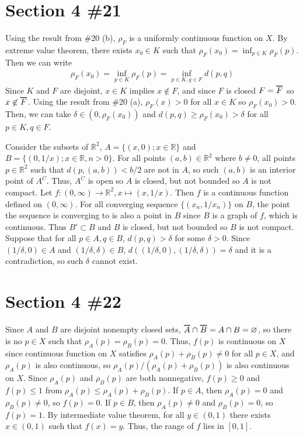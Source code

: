 \documentclass{scrartcl}
\newcommand\Overline[2][0.8pt]{%
  \begin{tikzpicture}[baseline=(a.base)]
    \node[inner xsep=0pt,inner ysep=1.5pt] (a) {$#2$};
    \draw[line width= #1] (a.north west) -- (a.north east);
  \end{tikzpicture}
}
\begin{document}
\section{Section 4 \#21}
Using the result from \#20 (b), \(\rho_F\) is a uniformly continuous function on \(X\).
By extreme value theorem, there exists \(x_0 \in K\) such that \(\rho_F(x_0) = \inf_{p \in K} \rho_F(p)\).
Then we can write
\begin{align*}
  \rho_F(x_0) = \inf_{p \in K} \rho_F(p) = \inf_{p \in K, q \in F} d(p, q)
\end{align*}
Since \(K\) and \(F\) are disjoint, \(x \in K\) implies \(x \not \in F\), and since \(F\) is closed \(F = \Overline{F}\) so \(x \not \in \Overline{F}\).
Using the result from \#20 (a), \(\rho_F(x) > 0\) for all \(x \in K\) so \(\rho_F(x_0) > 0\).
Then, we can take \(\delta \in (0, \rho_F(x_0))\) and \(d(p, q) \geq \rho_F(x_0) > \delta\) for all \(p \in K, q \in F\).

Consider the subsets of \(\mathbb{R}^2\), \(A = \{(x, 0); x \in \mathbb{R}\}\) and \(B = \{(0, 1 / x); x \in \mathbb{R}, n > 0\}\).
For all points \((a, b) \in \mathbb{R}^2\) where \(b \not = 0\), all points \(p \in \mathbb{R}^2\) such that \(d(p, (a, b)) < b / 2\) are not in \(A\), so such \((a, b)\) is an interior point of \(A^C\).
Thus, \(A^C\) is open so \(A\) is closed, but not bounded so \(A\) is not compact.
Let \(f : (0, \infty) \to \mathbb{R}^2, x \mapsto (x, 1 / x)\).
Then \(f\) is a continuous function defined on \((0, \infty)\).
For all converging sequence \(\{(x_n, 1 / x_n)\}\) on \(B\), the point the sequence is converging to is also a point in \(B\) since \(B\) is a graph of \(f\), which is continuous.
Thus \(B' \subset B\) and \(B\) is closed, but not bounded so \(B\) is not compact.
Suppose that for all \(p \in A, q \in B\), \(d(p, q) > \delta\) for some \(\delta > 0\).
Since \((1 / \delta, 0) \in A\) and \((1 / \delta, \delta) \in B\), \(d((1 / \delta, 0), (1 / \delta, \delta)) = \delta\) and it is a contradiction, so such \(\delta\) cannot exist.

\section{Section 4 \#22}
Since \(A\) and \(B\) are disjoint nonempty closed sets, \(\Overline{A} \cap \Overline{B} = A \cap B = \varnothing\), so there is no \(p \in X\) such that \(\rho_A(p) = \rho_B(p) = 0\).
Thus, \(f(p)\) is continuous on \(X\) since continuous function on \(X\) satisfies \(\rho_A(p) + \rho_B(p) \not = 0\) for all \(p \in X\), and \(\rho_A(p)\) is also continuous, so \(\rho_A(p) / (\rho_A(p) + \rho_B(p))\) is also continuous on \(X\).
Since \(\rho_A(p)\) and \(\rho_B(p)\) are both nonnegative, \(f(p) \geq 0\) and \(f(p) \leq 1\) from \(\rho_A(p) \leq \rho_A(p) + \rho_B(p)\).
If \(p \in A\), then \(\rho_A(p) = 0\) and \(\rho_B(p) \not = 0\), so \(f(p) = 0\).
If \(p \in B\), then \(\rho_A(p) \not = 0\) and \(\rho_B(p) = 0\), so \(f(p) = 1\).
By intermediate value theorem, for all \(y \in (0, 1)\) there exists \(x \in (0, 1)\) such that \(f(x) = y\).
Thus, the range of \(f\) lies in \([0, 1]\).
\end{document}
